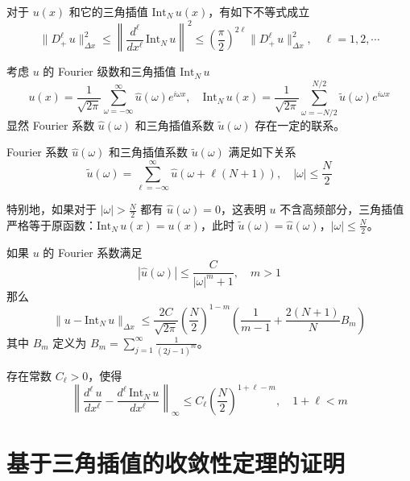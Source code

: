\begin{theorem}
    对于 $u(x)$ 和它的三角插值 $\text{Int}_N\,u(x)$，有如下不等式成立
    \[
        \| D^\ell_+\,u\|_{\Delta x}^2 \le
        \left\| \frac{d^\ell}{dx^\ell}\,\text{Int}_N \,u\right\|^2 \le
        \left(\frac{\pi}2\right)^{2\ell} \|D^\ell_+\,u\|_{\Delta x}^2,\quad \ell=1,2,\cdots
    \]
\end{theorem}

考虑 $u$ 的 Fourier 级数和三角插值 $\text{Int}_N\,u$
\[
    u(x) = \frac{1}{\sqrt{2\pi}} \sum_{\omega = -\infty}^\infty \widehat{u}(\omega) e^{i \omega x},\quad
    \text{Int}_N\,u(x) = \frac{1}{\sqrt{2\pi}} \sum_{\omega = -N/2}^{N/2} \widetilde{u}(\omega) e^{i \omega x}
\]
显然 Fourier 系数 $\widehat{u}(\omega)$ 和三角插值系数 $\widetilde{u}(\omega)$ 存在一定的联系。

\begin{lemma}
    Fourier 系数 $\widehat{u}(\omega)$ 和三角插值系数 $\widetilde{u}(\omega)$ 满足如下关系
    \[
        \widetilde{u}(\omega) = \sum_{\ell = -\infty}^\infty \widehat{u}(\omega + \ell(N+1)),\quad |\omega| \le \frac{N}2
    \]
\end{lemma}

特别地，如果对于 $|\omega| > \frac{N}2$ 都有 $\widehat{u}(\omega) = 0$，这表明 $u$ 不含高频部分，三角插值严格等于原函数：$\text{Int}_N\,u(x) = u(x)$，此时 $\widetilde{u}(\omega) = \widehat{u}(\omega)$，$|\omega| \le \frac{N}2$。

\begin{theorem}
    如果 $u$ 的 Fourier 系数满足
    \[
        |\widehat{u}(\omega)| \le \frac{C}{|\omega|^m+1},\quad m > 1
    \]
    那么
    \[
        \|u - \text{Int}_N\,u\|_{\Delta x} \le \frac{2C}{\sqrt{2\pi}}
        \left(\frac{N}2\right)^{1-m}
        \left(
        \frac{1}{m-1} + \frac{2(N+1)}N B_m
        \right)
    \]
    其中 $B_m$ 定义为 $B_m = \sum_{j = 1}^\infty \frac{1}{(2j-1)^m}$。
\end{theorem}

\begin{corollary}
    存在常数 $C_\ell > 0$，使得
    \[
        \left\|
        \frac{d^\ell \,u}{dx^\ell} - \frac{d^\ell \,\text{Int}_N\,u}{d x^\ell}
        \right\|_{\infty}
        \le C_\ell \left(\frac{N}2\right)^{1+\ell-m},\quad 1+\ell < m
    \]
\end{corollary}


\section{基于三角插值的收敛性定理的证明}



